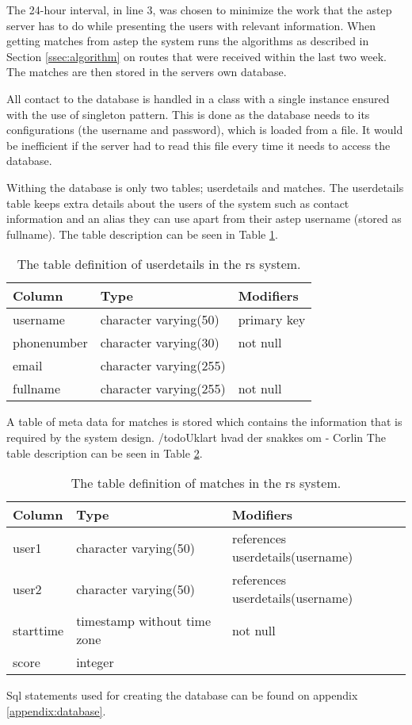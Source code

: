 The 24-hour interval, in line 3, was chosen to minimize the work that the \gls{astep} server has to do while presenting the users with relevant information.
When getting matches from \gls{astep} the system runs the algorithms as described in Section \ref{ssec:algorithm} on routes that were received within the last two week.
The matches are then stored in the servers own database.

All contact to the database is handled in a class with a single instance ensured with the use of singleton pattern. 
This is done as the database needs to its configurations (the username and password), which is loaded from a file.
It would be inefficient if the server had to read this file every time it needs to access the database.

Withing the database is only two tables; userdetails and matches.
The userdetails table keeps extra details about the users of the system such as contact information and an alias they can use apart from their \gls{astep} username (stored as fullname).
The table description can be seen in Table \ref{tab:userdetails}.

\begin{table}[h]
	\centering
	\begin{tabular}{l|l|l}
		Column 		& Type                   & Modifiers\\\hline
		username    & character varying(50)  & primary key\\
		phonenumber & character varying(30)  & not null\\
		email       & character varying(255) &\\
		fullname    & character varying(255) & not null\\
	\end{tabular}
	\caption{The table definition of userdetails in the \gls{rs} system.}
	\label{tab:userdetails}
\end{table}

A table of meta data for matches is stored which contains the information that is required by the system design. /todo{Uklart hvad der snakkes om - Corlin}
The table description can be seen in Table \ref{tab:matches}.

\begin{table}[h]
	\centering
	\begin{tabular}{l|l|l}
			   Column  &            Type             & Modifiers\\\hline
			 user1     & character varying(50)       & references userdetails(username)\\
			 user2     & character varying(50)       & references userdetails(username)\\
			 starttime & timestamp without time zone & not null\\
			 score     & integer                     &
	\end{tabular}
	\caption{The table definition of matches in the \gls{rs} system.}
	\label{tab:matches}
\end{table}

Sql statements used for creating the database can be found on appendix \ref{appendix:database}.